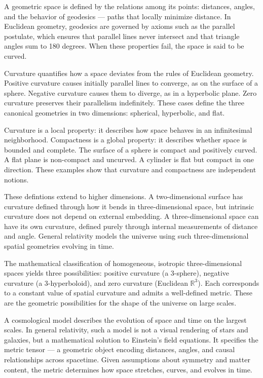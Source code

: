 A geometric space is defined by the relations among its points: distances, angles, and the behavior of geodesics — paths that locally minimize distance. In Euclidean geometry, geodesics are governed by axioms such as the parallel postulate, which ensures that parallel lines never intersect and that triangle angles sum to 180 degrees. When these properties fail, the space is said to be curved.

Curvature quantifies how a space deviates from the rules of Euclidean geometry. Positive curvature causes initially parallel lines to converge, as on the surface of a sphere. Negative curvature causes them to diverge, as in a hyperbolic plane. Zero curvature preserves their parallelism indefinitely. These cases define the three canonical geometries in two dimensions: spherical, hyperbolic, and flat.

Curvature is a local property: it describes how space behaves in an infinitesimal neighborhood. Compactness is a global property: it describes whether space is bounded and complete. The surface of a sphere is compact and positively curved. A flat plane is non-compact and uncurved. A cylinder is flat but compact in one direction. These examples show that curvature and compactness are independent notions.

These defintions extend to higher dimensions. A two-dimensional surface has curvature defined through how it bends in three-dimensional space, but intrinsic curvature does not depend on external embedding. A three-dimensional space can have its own curvature, defined purely through internal measurements of distance and angle. General relativity models the universe using such three-dimensional spatial geometries evolving in time.

The mathematical classification of homogeneous, isotropic three-dimensional spaces yields three possibilities: positive curvature (a 3-sphere), negative curvature (a 3-hyperboloid), and zero curvature (Euclidean $\mathbb{R}^3$). Each corresponds to a constant value of spatial curvature and admits a well-defined metric. These are the geometric possibilities for the shape of the universe on large scales.

A cosmological model describes the evolution of space and time on the largest scales. In general relativity, such a model is not a visual rendering of stars and galaxies, but a mathematical solution to Einstein’s field equations. It specifies the metric tensor — a geometric object encoding distances, angles, and causal relationships across spacetime. Given assumptions about symmetry and matter content, the metric determines how space stretches, curves, and evolves in time.

